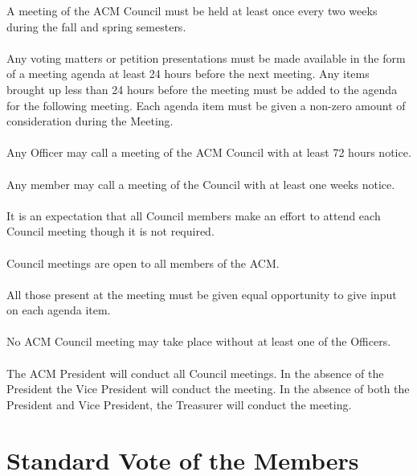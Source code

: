 \documentclass[12pt,titlepage]{article}
\begin{document}
A meeting of the ACM Council must be held at least once every two weeks during the fall and spring semesters.\\
\\
Any voting matters or petition presentations must be made available in the form of a meeting agenda at least 24 hours before the next meeting. Any items brought up less than 24 hours before the meeting must be added to the agenda for the following meeting. Each agenda item must be given a non-zero amount of consideration during the Meeting.\\
\\
Any Officer may call a meeting of the ACM Council with at least 72 hours notice.\\
\\
Any member may call a meeting of the Council with at least one weeks notice.\\
\\
It is an expectation that all Council members make an effort to attend each Council meeting though it is not required.\\
\\
Council meetings are open to all members of the ACM.\\
\\
All those present at the meeting must be given equal opportunity to give input on each agenda item.\\
\\
No ACM Council meeting may take place without at least one of the Officers.\\
\\
The ACM President will conduct all Council meetings. In the absence of the President the Vice President will conduct the meeting. In the absence of both the President and Vice President, the Treasurer will conduct the meeting.

\section{Standard Vote of the Members}
\end{document}

